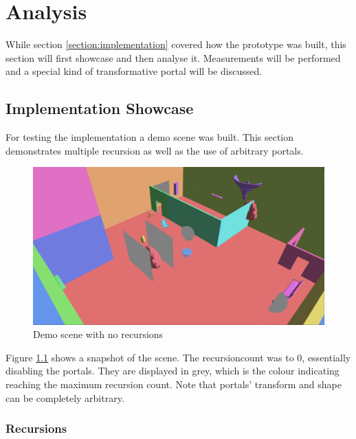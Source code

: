 \chapter{Analysis}
While section \ref{section:implementation} covered how the prototype was built, this section will first showcase and then analyse it. Measurements will be performed and a special kind of transformative portal will be discussed.

\section{Implementation Showcase}

For testing the implementation a demo scene was built. This section demonstrates multiple recursion as well as the use of arbitrary portals.

\begin{figure}[H]
	\centering
	\includegraphics[width=\linewidth]{images/portals.png}
	\caption{Demo scene with no recursions}
	\label{fig:demodisabled}
\end{figure}


Figure \ref{fig:demodisabled} shows a snapshot of the scene. The \gls{recursioncount} was to 0, essentially disabling the portals. They are displayed in grey, which is the colour indicating reaching the maximum recursion count. Note that portals' transform and shape can be completely arbitrary.

\subsection{Recursions}

